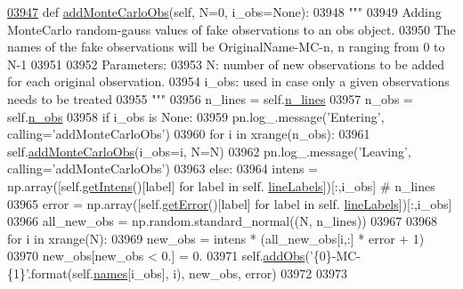 \begin{DoxyCode}
\hypertarget{classpyneb_1_1core_1_1pynebcore_1_1_observation_l03947}{}\hyperlink{classpyneb_1_1core_1_1pynebcore_1_1_observation_a8005a1ad8167e96e117d4b81d6e919ff}{03947}     \textcolor{keyword}{def }\hyperlink{classpyneb_1_1core_1_1pynebcore_1_1_observation_a8005a1ad8167e96e117d4b81d6e919ff}{addMonteCarloObs}(self, N=0, i\_obs=None):
03948         \textcolor{stringliteral}{"""}
03949 \textcolor{stringliteral}{        Adding MonteCarlo random-gauss values of fake observations to an obs object.}
03950 \textcolor{stringliteral}{        The names of the fake observations will be OriginalName-MC-n, n ranging from 0 to N-1}
03951 \textcolor{stringliteral}{        }
03952 \textcolor{stringliteral}{        Parameters:}
03953 \textcolor{stringliteral}{        N: number of new observations to be added for each original observation.}
03954 \textcolor{stringliteral}{        i\_obs: used in case only a given observations needs to be treated}
03955 \textcolor{stringliteral}{        """}
03956         n\_lines = self.\hyperlink{classpyneb_1_1core_1_1pynebcore_1_1_observation_ac61184d33006ae92f2a3ed42adc149be}{n\_lines}
03957         n\_obs = self.\hyperlink{classpyneb_1_1core_1_1pynebcore_1_1_observation_aef2877f7f50f5c70cee1f0da97b34081}{n\_obs}
03958         \textcolor{keywordflow}{if} i\_obs \textcolor{keywordflow}{is} \textcolor{keywordtype}{None}:
03959             pn.log\_.message(\textcolor{stringliteral}{'Entering'}, calling=\textcolor{stringliteral}{'addMonteCarloObs'})
03960             \textcolor{keywordflow}{for} i \textcolor{keywordflow}{in} xrange(n\_obs):
03961                 self.\hyperlink{classpyneb_1_1core_1_1pynebcore_1_1_observation_a8005a1ad8167e96e117d4b81d6e919ff}{addMonteCarloObs}(i\_obs=i, N=N)
03962             pn.log\_.message(\textcolor{stringliteral}{'Leaving'}, calling=\textcolor{stringliteral}{'addMonteCarloObs'})
03963         \textcolor{keywordflow}{else}:
03964             intens = np.array([self.\hyperlink{classpyneb_1_1core_1_1pynebcore_1_1_observation_ac380b22660411926b90f935f5123494b}{getIntens}()[label] \textcolor{keywordflow}{for} label \textcolor{keywordflow}{in} self.
      \hyperlink{classpyneb_1_1core_1_1pynebcore_1_1_observation_a6b3017332420d65de89c2d47ff51955e}{lineLabels}])[:,i\_obs] \textcolor{comment}{# n\_lines}
03965             error = np.array([self.\hyperlink{classpyneb_1_1core_1_1pynebcore_1_1_observation_a96cf2360b9b568a675d2c8177d47b3d2}{getError}()[label] \textcolor{keywordflow}{for} label \textcolor{keywordflow}{in} self.
      \hyperlink{classpyneb_1_1core_1_1pynebcore_1_1_observation_a6b3017332420d65de89c2d47ff51955e}{lineLabels}])[:,i\_obs]
03966             all\_new\_obs = np.random.standard\_normal((N, n\_lines))
03967             
03968             \textcolor{keywordflow}{for} i \textcolor{keywordflow}{in} xrange(N):
03969                 new\_obs = intens * (all\_new\_obs[i,:] * error + 1)
03970                 new\_obs[new\_obs < 0.] = 0.
03971                 self.\hyperlink{classpyneb_1_1core_1_1pynebcore_1_1_observation_a301e67ff50a467e97cd929039607a5d0}{addObs}(\textcolor{stringliteral}{'\{0\}-MC-\{1\}'}.format(self.\hyperlink{classpyneb_1_1core_1_1pynebcore_1_1_observation_a3f365d0b1488b2eba300bf71caf23c17}{names}[i\_obs], i), new\_obs, error)
03972     
03973 \end{DoxyCode}
